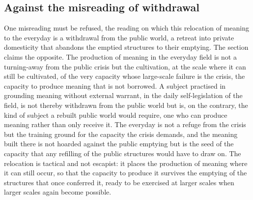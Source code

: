 \subsection{Against the misreading of withdrawal}
\label{p22:sub:self-leg-withdrawal}

One misreading must be refused, the reading on which this relocation of meaning to the everyday is a withdrawal from the public world, a retreat into private domesticity that abandons the emptied structures to their emptying. The section claims the opposite. The production of meaning in the everyday field is not a turning-away from the public crisis but the cultivation, at the scale where it can still be cultivated, of the very capacity whose large-scale failure is the crisis, the capacity to produce meaning that is not borrowed. A subject practised in grounding meaning without external warrant, in the daily self-legislation of the field, is not thereby withdrawn from the public world but is, on the contrary, the kind of subject a rebuilt public world would require, one who can produce meaning rather than only receive it. The everyday is not a refuge from the crisis but the training ground for the capacity the crisis demands, and the meaning built there is not hoarded against the public emptying but is the seed of the capacity that any refilling of the public structures would have to draw on. The relocation is tactical and not escapist: it places the production of meaning where it can still occur, so that the capacity to produce it survives the emptying of the structures that once conferred it, ready to be exercised at larger scales when larger scales again become possible.
